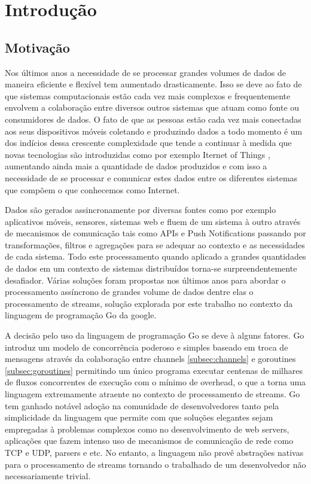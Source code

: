 \chapter{Introdução}
\label{cha:introduction}

\section{Motivação}
\label{sec:motivation}

Nos últimos anos a necessidade de se processar grandes volumes de dados de maneira eficiente e flexível tem aumentado drasticamente. Isso se deve ao fato de que sistemas computacionais estão cada vez mais complexos e frequentemente envolvem a colaboração entre diversos outros sistemas que atuam como fonte ou consumidores de dados. O fato de que as pessoas estão cada vez mais conectadas aos seus dispositivos móveis coletando e produzindo dados a todo momento é um dos indícios dessa crescente complexidade que tende a continuar à medida que novas tecnologias são introduzidas como por exemplo Iternet of Things \cite{blog:iot:council}, aumentando ainda mais a quantidade de dados produzidos e com isso a necessidade de se processar e comunicar estes dados entre os diferentes sistemas que compõem o que conhecemos como Internet.

Dados são gerados assincronamente por diversas fontes como por exemplo aplicativos móveis, sensores, sistemas web e fluem de um sistema à outro através de mecanismos de comunicação tais como APIs e Push Notifications \cite{docs:apple:push_notification} passando por transformações, filtros e agregações para se adequar ao contexto e as necessidades de cada sistema. Todo este processamento quando aplicado a grandes quantidades de dados em um contexto de sistemas distribuídos torna-se surpreendentemente desafiador. Várias soluções foram propostas nos últimos anos para abordar o processamento assíncrono de grandes volume de dados dentre elas o processamento de streams, solução explorada por este trabalho no contexto da linguagem de programação Go da google.

A decisão pelo uso da linguagem de programação Go se deve à alguns fatores. Go introduz um modelo de concorrência poderoso e simples baseado em troca de mensagens através da colaboração entre channels \ref{subsec:channels} e goroutines \ref{subsec:goroutines} permitindo um único programa executar centenas de milhares de fluxos concorrentes de execução com o mínimo de overhead, o que a torna uma linguagem extremamente atraente no contexto de processamento de streams. Go tem ganhado notável adoção na comunidade de desenvolvedores tanto pela simplicidade da linguagem que permite com que soluções elegantes sejam empregadas à problemas complexos como no desenvolvimento de web servers, aplicações que fazem intenso uso de mecanismos de comunicação de rede como TCP e UDP, parsers e etc. No entanto, a linguagem não provê abstrações nativas para o processamento de streams tornando o trabalhado de um desenvolvedor não necessariamente trivial.

